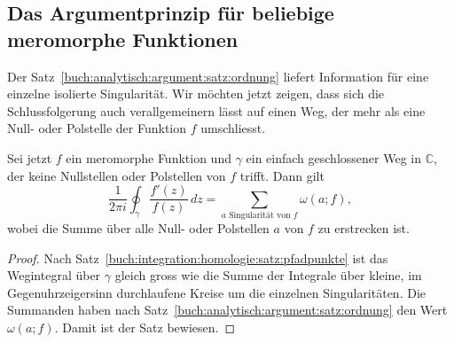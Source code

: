 %
%
%
\subsection{Das Argumentprinzip für beliebige meromorphe Funktionen}
Der Satz~\ref{buch:analytisch:argument:satz:ordnung}
liefert Information für eine einzelne isolierte Singularität.
Wir möchten jetzt zeigen, dass sich die Schlussfolgerung auch
verallgemeinern lässt auf einen Weg, der mehr als eine Null-
oder Polstelle der Funktion $f$ umschliesst.

\begin{satz}
\label{buch:analytisch:argument:satz:argument}
%
%
Sei jetzt $f$ ein meromorphe Funktion und $\gamma$ ein einfach
geschlossener Weg in $\mathbb{C}$, der keine Nullstellen oder Polstellen
von $f$ trifft.
Dann gilt
\[
\frac{1}{2\pi i}
\oint_\gamma
\frac{f'(z)}{f(z)}
\,dz
=
\sum_{\text{$a$ Singularität von $f$}}
\omega(a;f),
\]
wobei die Summe über alle Null- oder Polstellen $a$ von $f$ 
zu erstrecken ist.
\end{satz}

\begin{proof}
Nach Satz~\ref{buch:integration:homologie:satz:pfadpunkte} ist das
Wegintegral über $\gamma$ gleich gross wie die Summe der Integrale
über kleine, im Gegenuhrzeigersinn durchlaufene Kreise um die einzelnen
Singularitäten.
Die Summanden haben nach
Satz~\ref{buch:analytisch:argument:satz:ordnung}
den Wert $\omega(a;f)$.
Damit ist der Satz bewiesen.
\end{proof}
